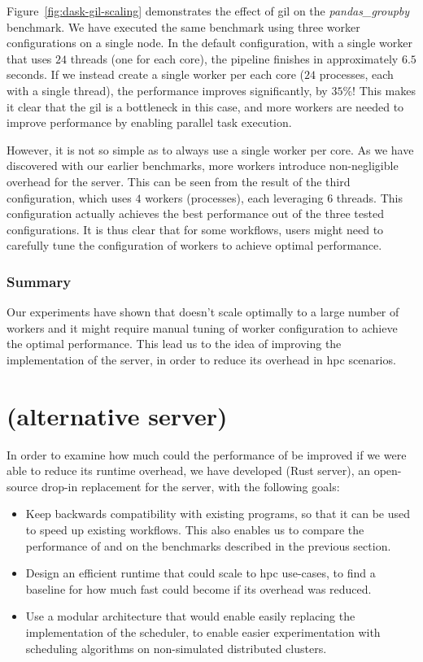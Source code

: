 Figure~\ref{fig:dask-gil-scaling} demonstrates the effect of \gls{gil} on the
\emph{pandas\_groupby} benchmark. We have executed the same benchmark using three
\dask{} worker configurations on a single node. In the default configuration,
with a single worker that uses $24$ threads (one for each core), the pipeline
finishes in approximately $6.5$ seconds. If we instead create a single worker
per each core ($24$ processes, each with a single thread), the performance
improves significantly, by $35\%$! This makes it clear that the
\gls{gil} is a bottleneck in this case, and more \dask{}
workers are needed to improve performance by enabling parallel task execution.

However, it is not so simple as to always use a single \dask{} worker per core.
As we have discovered with our earlier benchmarks, more workers introduce non-negligible overhead
for the \dask{} server. This can be seen from the result of the third
configuration, which uses $4$ \dask{} workers
(processes), each leveraging $6$ threads. This configuration actually
achieves the best performance out of the three tested configurations. It is thus clear that for
some \dask{} workflows, users might need to carefully tune the configuration of
workers to achieve optimal performance.

\subsubsection*{Summary}
Our experiments have shown that \dask{} doesn't scale optimally to a large
number of workers and it might require manual tuning of worker configuration to achieve the optimal
performance. This lead us to the idea of improving the implementation of the
\dask{} server, in order to reduce its overhead in \gls{hpc}
scenarios.

\section{\rsds{} (alternative \dask{} server)}
\label{sec:rsds-description}
In order to examine how much could the performance of \dask{} be improved if we
were able to reduce its runtime overhead, we have developed \rsds{} (Rust \dask{} server), an
open-source drop-in replacement for the \dask{}
server, with the following goals:

\begin{itemize}
	\item Keep backwards compatibility with existing \dask{} programs, so that it can be
	      used to speed up existing workflows. This also enables us to compare the performance of
	      \rsds{} and \dask{} on the benchmarks described in the
	      previous section.
	\item Design an efficient runtime that could scale to \gls{hpc} use-cases, to find a
	      baseline for how much fast could \dask{} become if its overhead was reduced.
	\item Use a modular architecture that would enable easily replacing the implementation of the scheduler,
	      to enable easier experimentation with scheduling algorithms on non-simulated distributed clusters.
\end{itemize}

